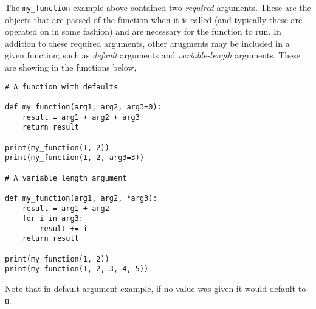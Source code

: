 \documentclass[a4paper]{article}
\begin{document}
The \texttt{my\_function} example above contained two \emph{required} arguments.
These are the objects that are passed of the function when it is called (and typically these are operated on in some fashion) and are necessary for the function to run.
In addition to these required arguments, other arugments may be included in a given function; such as \emph{default} arguments and \emph{variable-length} arguments.
These are showing in the functions below,
\begin{lstlisting}
# A function with defaults

def my_function(arg1, arg2, arg3=0):
    result = arg1 + arg2 + arg3
    return result

print(my_function(1, 2))
print(my_function(1, 2, arg3=3))

# A variable length argument

def my_function(arg1, arg2, *arg3):
    result = arg1 + arg2
    for i in arg3:
        result += i
    return result

print(my_function(1, 2))
print(my_function(1, 2, 3, 4, 5))
\end{lstlisting}
Note that in default argument example, if no value was given it would default to \texttt{0}.


%
%
\end{document}
